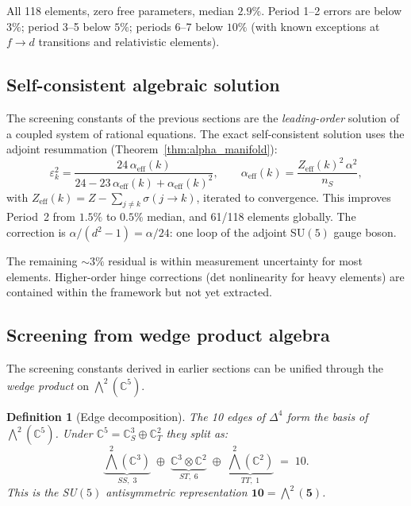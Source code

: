 \documentclass[12pt]{article}
\newtheorem{definition}[theorem]{Definition}
\theoremstyle{remark}
\theoremstyle{definition}
\newcommand{\CC}{\mathbb{C}}
\begin{document}
All 118 elements, zero free parameters, median $2.9\%$.  Period 1--2 errors are below $3\%$; period 3--5 below $5\%$; periods 6--7 below $10\%$ (with known exceptions at $f\!\to\!d$ transitions and relativistic elements).

\subsection{Self-consistent algebraic solution}
\label{sec:self_consistent}

The screening constants of the previous sections are the \emph{leading-order} solution of a coupled system of rational equations.  The exact self-consistent solution uses the adjoint resummation (Theorem~\ref{thm:alpha_manifold}):
\begin{equation}
\varepsilon_k^2 = \frac{24\,\alpha_{\text{eff}}(k)}{24 - 23\,\alpha_{\text{eff}}(k) + \alpha_{\text{eff}}(k)^2},
\qquad
\alpha_{\text{eff}}(k) = \frac{Z_{\text{eff}}(k)^2\,\alpha^2}{n_S},
\end{equation}
with $Z_\text{eff}(k) = Z - \sum_{j \neq k} \sigma(j \to k)$, iterated to convergence.  This improves Period~2 from $1.5\%$ to $0.5\%$ median, and 61/118 elements globally.  The correction is $\alpha/(d^2\!-\!1) = \alpha/24$: one loop of the adjoint SU$(5)$ gauge boson.

The remaining $\sim 3\%$ residual is within measurement uncertainty for most elements.  Higher-order hinge corrections (det nonlinearity for heavy elements) are contained within the framework but not yet extracted.

\subsection{Screening from wedge product algebra}
\label{sec:wedge_screening}

The screening constants derived in earlier sections can be unified through the \emph{wedge product} on $\bigwedge^2(\CC^5)$.

\begin{definition}[Edge decomposition]
The 10 edges of $\Delta^4$ form the basis of $\bigwedge^2(\CC^5)$.
Under $\CC^5 = \CC^3_S \oplus \CC^2_T$ they split as:
\[
\underbrace{\bigwedge^2(\CC^3)}_{SS,\;3}
\;\oplus\;
\underbrace{\CC^3 \otimes \CC^2}_{ST,\;6}
\;\oplus\;
\underbrace{\bigwedge^2(\CC^2)}_{TT,\;1}
\;=\; 10.
\]
This is the SU$(5)$ antisymmetric representation $\mathbf{10} = \bigwedge^2(\mathbf{5})$.
\end{definition}
\end{document}
